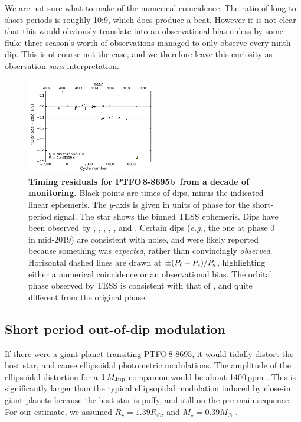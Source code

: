 \documentclass[12pt,twocolumn,tighten]{aastex62}
\newcommand{\ptfo}{PTFO$\,$8-8695}
\newcommand{\ptfob}{PTFO$\,$8-8695b}
\begin{document}
We are not sure what to make of the numerical coincidence.
The ratio of long to short periods is roughly 10:9, which does produce a beat.
However it is not clear that this would obviously translate into
an observational bias unless by some fluke three season's worth 
of observations managed to only observe every ninth dip.
This is of course not the case, and we therefore leave this 
curiosity as observation {\it sans} interpretation.


\begin{figure}[t]
	\begin{center}
		\leavevmode
		\includegraphics[width=0.5\textwidth]{f6.pdf}
	\end{center}
	\vspace{-0.7cm}
	\caption{
		{\bf Timing residuals for \ptfob\ from a decade of monitoring.}
    Black points are times of dips, minus the indicated linear
    ephemeris.  The $y$-axis is given in units of phase for the
    short-period signal.  The star shows the binned TESS ephemeris.
    Dips have been observed by \citet{van_eyken_ptf_2012},
    \citet{ciardi_followup_2015}, \citet{yu_tests_2015},
    \citet{raetz_yeti_2016}, \citet{onitsuka_multicolor_2017}, and
    \citet{tanimoto_evidence_2020}.  Certain dips ({\it e.g.}, the one
    at phase 0 in mid-2019) are consistent with noise, and were likely
    reported because something was {\it expected}, rather than
    convincingly {\it observed}.  Horizontal dashed lines are drawn at
    $\pm (P_{\rm \ell} - P_{\rm s})/P_{\rm s}$, highlighting either a numerical
    coincidence or an observational bias.  The orbital phase observed by TESS
    is consistent with that of \citet{tanimoto_evidence_2020}, and
    quite different from the original phase.
		\label{fig:o_minus_c}
	}
\end{figure}


\subsection{Short period out-of-dip modulation}
If there were a giant planet transiting \ptfo, it would tidally
distort the host star, and cause ellipsoidal photometric modulations.
The amplitude of the ellipsoidal distortion for a $1\,M_{\rm Jup}$
companion would be about 1400$\,$ppm
\citep{shporer_astrophysics_2017}.  This is significantly larger than
the typical ellipsopidal modulation induced by close-in giant planets
because the host star is puffy, and still on the pre-main-sequence.
For our estimate, we assumed $R_\star = 1.39 R_\odot$, and $M_\star =
0.39 M_\odot$ \citep{van_eyken_ptf_2012}. 
\end{document}
